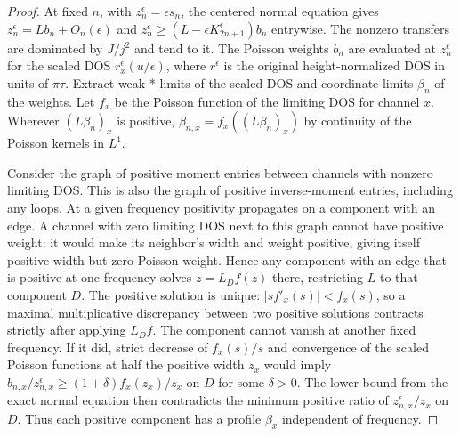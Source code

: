 \documentclass[11pt]{article}
\begin{document}
\begin{proof}
At fixed $n$, with $z_n^\epsilon=\epsilon s_n$, the centered normal equation gives $z_n^\epsilon=Lb_n+O_n(\epsilon)$ and $z_n^\epsilon\ge (L-\epsilon K_{2n+1}^\epsilon)b_n$ entrywise. The nonzero transfers are dominated by $J/j^2$ and tend to it. The Poisson weights $b_n$ are evaluated at $z_n^\epsilon$ for the scaled DOS $r_x^\epsilon(u/\epsilon)$, where $r^\epsilon$ is the original height-normalized DOS in units of $\pi\tau$. Extract weak-* limits of the scaled DOS and coordinate limits $\beta_n$ of the weights. Let $f_x$ be the Poisson function of the limiting DOS for channel $x$. Wherever $(L\beta_n)_x$ is positive, $\beta_{n,x}=f_x((L\beta_n)_x)$ by continuity of the Poisson kernels in $L^1$.

Consider the graph of positive moment entries between channels with nonzero limiting DOS. This is also the graph of positive inverse-moment entries, including any loops. At a given frequency positivity propagates on a component with an edge. A channel with zero limiting DOS next to this graph cannot have positive weight: it would make its neighbor's width and weight positive, giving itself positive width but zero Poisson weight. Hence any component with an edge that is positive at one frequency solves $z=L_D f(z)$ there, restricting $L$ to that component $D$. The positive solution is unique: $|s f'_x(s)|<f_x(s)$, so a maximal multiplicative discrepancy between two positive solutions contracts strictly after applying $L_D f$. The component cannot vanish at another fixed frequency. If it did, strict decrease of $f_x(s)/s$ and convergence of the scaled Poisson functions at half the positive width $z_x$ would imply $b_{n,x}/z_{n,x}^\epsilon\ge(1+\delta)f_x(z_x)/z_x$ on $D$ for some $\delta>0$. The lower bound from the exact normal equation then contradicts the minimum positive ratio of $z_{n,x}^\epsilon/z_x$ on $D$. Thus each positive component has a profile $\beta_x$ independent of frequency.


\end{proof}
\end{document}

